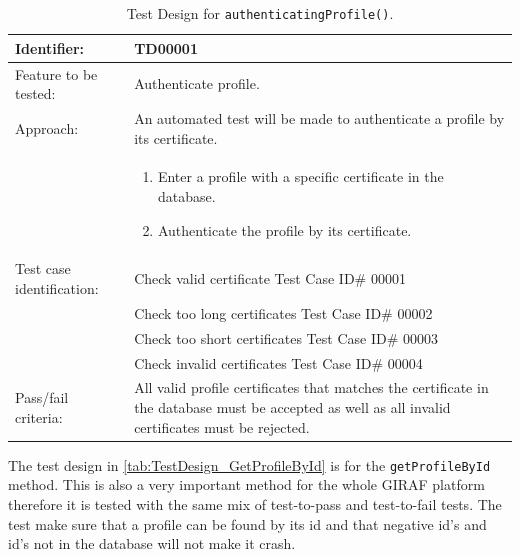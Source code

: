 \begin{table}[htbp]
	\centering
		\begin{tabular}{| p{4.5cm} | m{9cm} |}
			\hline
			Identifier: 				& TD00001 \\ \hline
			Feature to be tested:		& Authenticate profile. \\ \hline
			Approach:					& An automated test will be made to authenticate a profile by its certificate. \\
										&	\begin{enumerate}
												\item Enter a profile with a specific certificate in the database.
												\item Authenticate the profile by its certificate.
											\end{enumerate} \\ \hline
			Test case identification: 	& Check valid certificate Test Case ID\# 00001 \\
										& Check too long certificates Test Case ID\# 00002 \\
										& Check too short certificates Test Case ID\# 00003 \\
										& Check invalid certificates Test Case ID\# 00004 \\ \hline
			Pass/fail criteria:			& All valid profile certificates that matches the certificate in the database must be accepted as well as all invalid certificates must be rejected. \\ \hline
		\end{tabular}
	\caption{Test Design for \texttt{authenticatingProfile()}.}
	\label{tab:TestDesign_AuthenticateProfile}
\end{table}

The test design in \autoref{tab:TestDesign_GetProfileById} is for the \texttt{getProfileById} method.
This is also a very important method for the whole GIRAF platform therefore it is tested with the same mix of test-to-pass and test-to-fail tests.
The test make sure that a profile can be found by its id and that negative id's and id's not in the database will not make it crash.

